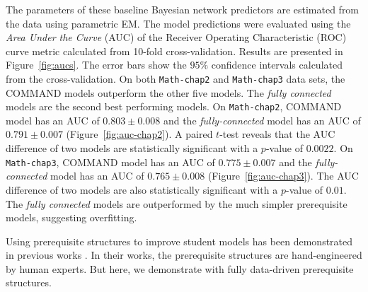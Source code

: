 \documentclass{edm_template}
\newcommand{\hl}[1]{\colorbox{yellow}{#1}}
\begin{document}
	The parameters of these baseline Bayesian network predictors are estimated from the data using parametric EM.
	The model predictions were evaluated using the \textit{Area Under the Curve} (AUC) of the Receiver Operating Characteristic (ROC) curve metric 
	calculated from 10-fold cross-validation.
	Results are presented in Figure~\ref{fig:aucs}. 
	The error bars show the $95\%$ confidence intervals calculated from the cross-validation.
	On both \texttt{Math-chap2} and \texttt{Math-chap3} data sets, the COMMAND models outperform the other five models.
	The \emph{fully connected} models are the second best performing models.
	On \texttt{Math-chap2}, COMMAND model has an AUC of $0.803\pm0.008$ and the \emph{fully-connected} model has an AUC of $0.791\pm0.007$ (Figure~\ref{fig:auc-chap2}).
	A paired $t$-test reveals that the AUC difference of two models are statistically significant with a $p$-value of $0.0022$.
	On \texttt{Math-chap3}, COMMAND model has an AUC of $0.775\pm0.007$ and the \emph{fully-connected} model has an AUC of $0.765\pm0.008$ (Figure~\ref{fig:auc-chap3}).
	The AUC difference of two models are also statistically significant with a $p$-value of $0.01$.
	The \emph{fully connected} models are outperformed by the much simpler prerequisite models, suggesting overfitting.
	
	Using prerequisite structures to improve student models has been demonstrated in previous works \cite{kaser2014beyond, botelho2015prediction}.
	In their works, the prerequisite structures are hand-engineered by human experts. But here, we demonstrate with fully data-driven prerequisite structures.
	
	
	
\end{document}
